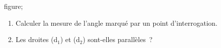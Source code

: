 \documentclass[exercice]{thedocument}%
\begin{document}
%
    \begin{center}
        \<figure;
    \end{center}
    \begin{enumerate}
        \item Calculer la mesure de l'angle marqué par un point d'interrogation.
        \item Les droites (d$_1$) et (d$_2$) sont-elles parallèles~?\par\noindent
    \end{enumerate}
\end{document}
